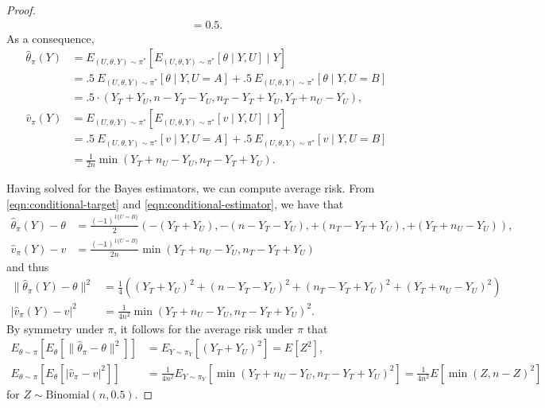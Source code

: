 \documentclass[12pt,reqno]{amsart}
\begin{document}
\begin{proof}
\begin{align*}
        = 0.5.
    \end{align*}
    As a consequence,
    \begin{equation}
    \label{eqn:conditional-estimator}
        \begin{aligned}
        \hat{\theta}_\pi(Y) &= E_{(U,\theta,Y) \sim \pi^*}[E_{(U,\theta,Y) \sim \pi^*}[\theta \mid Y, U] \mid Y]
        \\
        &= .5 \: E_{(U,\theta,Y) \sim \pi^*}[\theta \mid Y, U = A] + .5 \: E_{(U,\theta,Y) \sim \pi^*}[\theta \mid Y, U = B]
        \\
        &= .5 \cdot (Y_T + Y_U, n - Y_T - Y_U, n_T - Y_T + Y_U, Y_T + n_U - Y_U),
        \\
        \hat{v}_\pi(Y) &= E_{(U,\theta,Y) \sim \pi^*}[E_{(U,\theta,Y) \sim \pi^*}[v \mid Y, U] \mid Y]
        \\
        &= .5 \: E_{(U,\theta,Y) \sim \pi^*}[v \mid Y, U = A] + .5 \: E_{(U,\theta,Y) \sim \pi^*}[v \mid Y, U = B]
        \\
        &= \frac{1}{2 n} \min(Y_T + n_U - Y_U, n_T - Y_T + Y_U).
    \end{aligned}
    \end{equation}

    Having solved for the Bayes estimators, we can compute average risk.
    From \eqref{eqn:conditional-target} and \eqref{eqn:conditional-estimator}, we have that
    \begin{align*}
        \hat{\theta}_\pi(Y) - \theta
        &=  \frac{(-1)^{1\{U=B\}}}{2} (-(Y_T + Y_U), -(n - Y_T - Y_U), +(n_T - Y_T + Y_U), +(Y_T + n_U - Y_U)),
        \\
        \hat{v}_\pi(Y) - v
        &= \frac{(-1)^{1\{U=B\}}}{2n}  \min(Y_T + n_U - Y_U, n_T - Y_T + Y_U)
    \end{align*}
    and thus
    \begin{align*}
        \| \hat{\theta}_\pi(Y) - \theta \|^2
        &= \frac{1}{4} \left( (Y_T + Y_U)^2 + (n - Y_T - Y_U)^2 + (n_T - Y_T + Y_U)^2 + (Y_T + n_U - Y_U)^2 \right)
        \\
        | \hat{v}_\pi(Y) - v |^2
        &= \frac{1}{4 n^2}  \min(Y_T + n_U - Y_U, n_T - Y_T + Y_U)^2.
    \end{align*}
    By symmetry under $\pi$, it follows for the average risk under $\pi$ that
    \begin{align*}
        E_{\theta \sim \pi}[ E_\theta [\| \hat{\theta}_\pi - \theta \|^2]]
        &= E_{Y \sim \pi_Y}[(Y_T + Y_U)^2]
        = E[Z^2],
        \\
        E_{\theta \sim \pi} [E_\theta [| \hat{v}_\pi - v |^2]]
        &= \frac{1}{4 n^2} E_{Y \sim \pi_Y}[\min(Y_T {+} n_U {-} Y_U, n_T {-} Y_T {+} Y_U)^2]
        = \frac{1}{4 n^2} E[\min(Z, n {-} Z)^2]
    \end{align*}
    for $Z \sim \text{Binomial}(n,0.5)$.


\end{proof}
\end{document}
